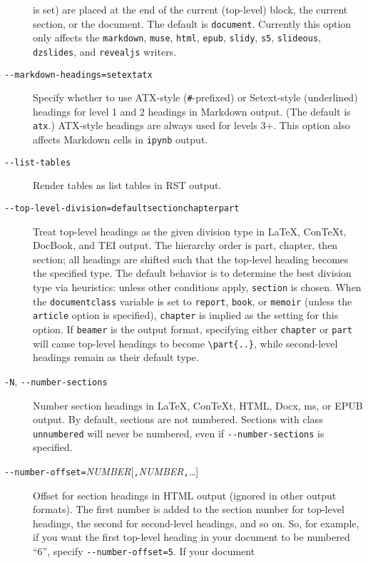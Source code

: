 \begin{description}
is set) are placed at the end of the current (top-level) block, the
current section, or the document. The default is \texttt{document}.
Currently this option only affects the \texttt{markdown}, \texttt{muse},
\texttt{html}, \texttt{epub}, \texttt{slidy}, \texttt{s5},
\texttt{slideous}, \texttt{dzslides}, and \texttt{revealjs} writers.
\item[\texttt{-\/-markdown-headings=setext}\textbar{}\texttt{atx}]
Specify whether to use ATX-style (\texttt{\#}-prefixed) or Setext-style
(underlined) headings for level 1 and 2 headings in Markdown output.
(The default is \texttt{atx}.) ATX-style headings are always used for
levels 3+. This option also affects Markdown cells in \texttt{ipynb}
output.
\item[\texttt{-\/-list-tables}]
Render tables as list tables in RST output.
\item[\texttt{-\/-top-level-division=default}\textbar{}\texttt{section}\textbar{}\texttt{chapter}\textbar{}\texttt{part}]
Treat top-level headings as the given division type in LaTeX, ConTeXt,
DocBook, and TEI output. The hierarchy order is part, chapter, then
section; all headings are shifted such that the top-level heading
becomes the specified type. The default behavior is to determine the
best division type via heuristics: unless other conditions apply,
\texttt{section} is chosen. When the \texttt{documentclass} variable is
set to \texttt{report}, \texttt{book}, or \texttt{memoir} (unless the
\texttt{article} option is specified), \texttt{chapter} is implied as
the setting for this option. If \texttt{beamer} is the output format,
specifying either \texttt{chapter} or \texttt{part} will cause top-level
headings to become \texttt{\textbackslash{}part\{..\}}, while
second-level headings remain as their default type.
\item[\texttt{-N}, \texttt{-\/-number-sections}]
Number section headings in LaTeX, ConTeXt, HTML, Docx, ms, or EPUB
output. By default, sections are not numbered. Sections with class
\texttt{unnumbered} will never be numbered, even if
\texttt{-\/-number-sections} is specified.
\item[\texttt{-\/-number-offset=}\emph{NUMBER}{[}\texttt{,}\emph{NUMBER}\texttt{,}\emph{\ldots{}}{]}]
Offset for section headings in HTML output (ignored in other output
formats). The first number is added to the section number for top-level
headings, the second for second-level headings, and so on. So, for
example, if you want the first top-level heading in your document to be
numbered ``6'', specify \texttt{-\/-number-offset=5}. If your document

\end{description}
